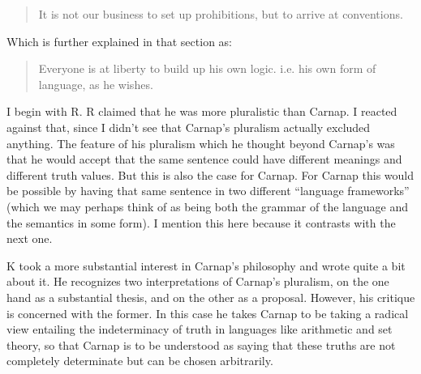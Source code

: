 \begin{quote}
It is not our business to set up prohibitions, but to arrive at conventions.
\end{quote}

Which is further explained in that section as:
\begin{quote}
Everyone is at liberty to build up his own logic. i.e. his own form of language, as he wishes.
\end{quote}

I begin with R.
R claimed that he was more pluralistic than Carnap.
I reacted against that, since I didn't see that Carnap's pluralism actually excluded anything.
The feature of his pluralism which he thought beyond Carnap's was that he would accept that the same sentence could have different meanings and different truth values.
But this is also the case for Carnap.
For Carnap this would be possible by having that same sentence in two different ``language frameworks'' (which we may perhaps think of as being both the grammar of the language and the semantics in some form).
I mention this here because it contrasts with the next one.

K took a more substantial interest in Carnap's philosophy and wrote quite a bit about it.
He recognizes two interpretations of Carnap's pluralism, on the one hand as a substantial thesis, and on the other as a proposal.
However, his critique is concerned with the former.
In this case he takes Carnap to be taking a radical view entailing the indeterminacy of truth in languages like arithmetic and set theory, so that Carnap is to be understood as saying that these truths are not completely determinate but can be chosen arbitrarily.

